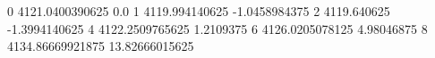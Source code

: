0 4121.0400390625 0.0
1 4119.994140625 -1.0458984375
2 4119.640625 -1.3994140625
4 4122.2509765625 1.2109375
6 4126.0205078125 4.98046875
8 4134.86669921875 13.82666015625

